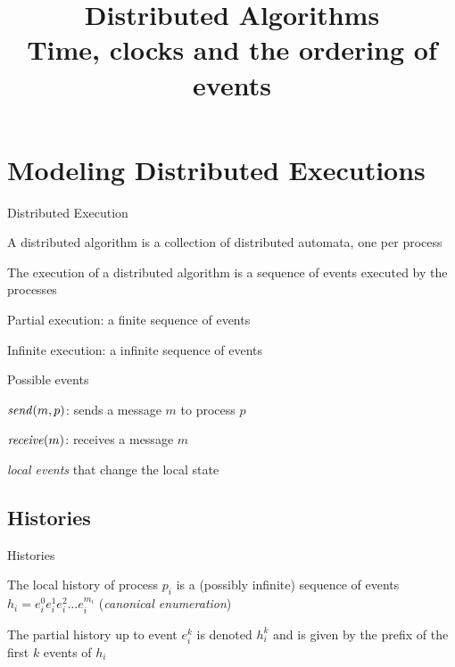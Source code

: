 
\title[DS - Time,clocks,events]{\textbf{Distributed Algorithms}\\Time, clocks and the ordering of events}



\begin{frame}
\titlepage
\end{frame}

\section{Modeling Distributed Executions}

\begin{frame}[shrink=5]{Distributed Execution}

\begin{definition}
A \alert{distributed algorithm} is a collection of distributed automata,
one per process
\end{definition}
\vfill
\begin{definition}
	The \alert{execution} of a distributed algorithm is a sequence of \alert{events} executed
  by the processes
  \BI
  \item \alert{Partial execution}: a finite sequence of events
  \item \alert{Infinite execution}: a infinite sequence of events
  \EI
\end{definition}
\vfill
\begin{block}{Possible events}
  \BI
   \item $\mathit{send}(m,p)$: sends a message $m$ to process $p$
   \item $\mathit{receive}(m)$: receives a message $m$
   \item {\em local events} that change the local state
  \EI
\end{block}
\end{frame}

\subsection{Histories}

\begin{frame}{Histories}
	
\begin{definition}
The \alert{local history} of process $p_i$ is a (possibly infinite)
  sequence of events $h_i = e^0_i e^1_i e^2_i \ldots e^{m_i}_i$ (\emph{canonical enumeration})
\end{definition}
\vfill
\begin{definition}
The \alert{partial history} up to event $e^k_i$ is denoted $h^k_i$ and
  is given by the prefix of the first $k$ events of $h_i$
\end{definition}
\vfill

\end{frame}

